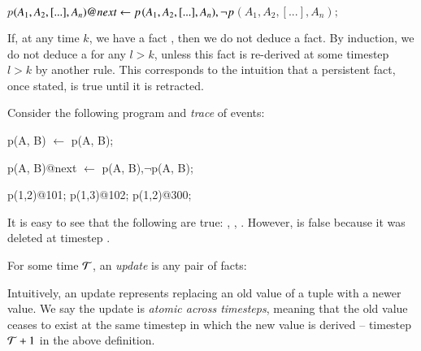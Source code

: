 $p$\pos$(A_1,A_2,[...],A_n)@next \leftarrow \\
p$\pos$(A_1,A_2,[...],A_n), \\
\lnot p$\nega$(A_1,A_2,[...],A_n);
$

%
%

If, at any time $k$, we have a fact
, then we do not deduce a
 fact.  By induction, we do not
deduce a  for any $l > k$, unless
this  fact is re-derived at some timestep $l > k$ by another
rule.  This corresponds to the intuition that a persistent fact, once stated,
is true until it is retracted.  

\begin{example}
Consider the following \lang program and {\em trace} of events:

\begin{Dedalus}
p\pos(A, B) \(\leftarrow\) p(A, B);

p\pos(A, B)@next \(\leftarrow\) p\pos(A, B),\(\lnot\)p\nega(A, B);

p(1,2)@101;
p(1,3)@102;
p\nega(1,2)@300;
\end{Dedalus}

It is easy to see that the following are true: ,
, .  However,  is
false because it was deleted at timestep .
\end{example}

%
For some time $\Tau$, an {\em update} is any pair of facts:

 \linebreak
{}
%

Intuitively, an update represents replacing an old value of a tuple with a
newer value.  We say the update is {\em atomic across timesteps}, meaning that
the old value ceases to exist at the same timestep in which the new value
is derived -- timestep $\Tau+1$ in the above definition.



